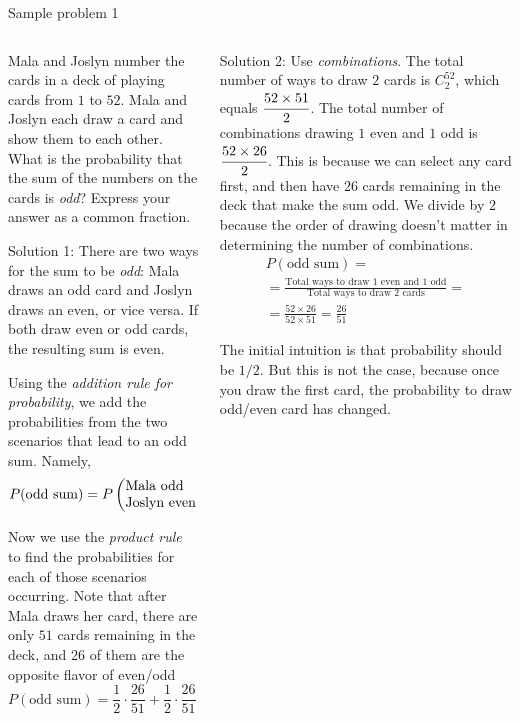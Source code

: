 \documentclass[9pt,aspectratio=169]{beamer}
\begin{document}
\begin{frame}{Sample problem 1}
  \begin{columns}[T]
    \begin{column}{0.5\textwidth}
      {\small
      \begin{problem}
        Mala and Joslyn number the cards in a deck of playing cards from $1$ to $52$. Mala and Joslyn each draw a card and show them to each other. What is the probability that the sum of the numbers on the cards is \emph{odd}? Express your answer as a common fraction.
      \end{problem}

      {\color{textBlue} Solution 1:} There are two ways for the sum to be \emph{odd}:  Mala draws an odd card and Joslyn draws an even, or vice versa.  If both draw even or odd cards, the resulting sum is even.

      Using the \emph{addition rule for probability}, we add the probabilities from the two scenarios that lead to an odd sum.  Namely, 
      \[ P(\text{odd sum}) = P\left(\text{\parbox{5.3em}{Mala odd\\Joslyn even}}\right) + P\left(\text{\parbox{4.8em}{Mala even\\Joslyn odd}}\right). \]
      
      Now we use the \emph{product rule} to find the probabilities for each of those scenarios occurring.  Note that after Mala draws her card, there are only $51$ cards remaining in the deck, and $26$ of them are the opposite flavor of even/odd
      \[ P(\text{odd sum}) = \frac{1}{2} \cdot \frac{26}{51} + \frac{1}{2} \cdot \frac{26}{51} = \frac{26}{51}. \]
      }
    \end{column}
    \begin{column}{0.5\textwidth}
      {\small
      {\color{textBlue} Solution 2:} Use \emph{combinations}. The total number of ways to draw $2$ cards is $C_2^{52}$, which equals $\cfrac{52 \times 51}{2}$. The total number of combinations drawing $1$ even and $1$ odd is $\cfrac{52 \times 26}{2}$.  This is because we can select any card first, and then have $26$ cards remaining in the deck that make the sum odd.  We divide by $2$ because the order of drawing doesn’t matter in determining the number of combinations.\begin{multline*} 
        P(\text{odd sum}) = \\ = \frac{\text{Total ways to draw $1$ even and $1$ odd}}{\text{Total ways to draw $2$ cards}} = \\ = \frac{52 \times 26}{52 \times 51} = \frac{26}{51}
      \end{multline*}
      }
      \begin{example}
        The initial intuition is that probability should be $1/2$. But this is not the case, because once you draw the first card, the probability to draw odd/even card has changed.  
      \end{example}
    \end{column}
  \end{columns}
\end{frame}
\end{document}
